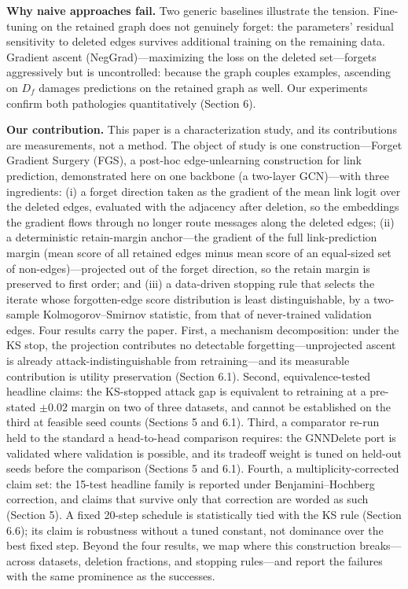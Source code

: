 \documentclass[pdflatex,sn-basic,Numbered]{sn-jnl}
\begin{document}
\textbf{Why naive approaches fail.} Two generic baselines illustrate the tension. Fine-tuning on the retained graph does not genuinely forget: the parameters' residual sensitivity to deleted edges survives additional training on the remaining data. Gradient ascent (NegGrad)---maximizing the loss on the deleted set---forgets aggressively but is uncontrolled: because the graph couples examples, ascending on $D_f$ damages predictions on the retained graph as well. Our experiments confirm both pathologies quantitatively (Section 6).

\textbf{Our contribution.} This paper is a characterization study, and its contributions are measurements, not a method. The object of study is one construction---Forget Gradient Surgery (FGS), a post-hoc edge-unlearning construction for link prediction, demonstrated here on one backbone (a two-layer GCN)---with three ingredients: (i) a forget direction taken as the gradient of the mean link logit over the deleted edges, evaluated with the adjacency after deletion, so the embeddings the gradient flows through no longer route messages along the deleted edges; (ii) a deterministic retain-margin anchor---the gradient of the full link-prediction margin (mean score of all retained edges minus mean score of an equal-sized set of non-edges)---projected out of the forget direction, so the retain margin is preserved to first order; and (iii) a data-driven stopping rule that selects the iterate whose forgotten-edge score distribution is least distinguishable, by a two-sample Kolmogorov--Smirnov statistic, from that of never-trained validation edges. Four results carry the paper. First, a mechanism decomposition: under the KS stop, the projection contributes no detectable forgetting---unprojected ascent is already attack-indistinguishable from retraining---and its measurable contribution is utility preservation (Section 6.1). Second, equivalence-tested headline claims: the KS-stopped attack gap is equivalent to retraining at a pre-stated $\pm$0.02 margin on two of three datasets, and cannot be established on the third at feasible seed counts (Sections 5 and 6.1). Third, a comparator re-run held to the standard a head-to-head comparison requires: the GNNDelete port is validated where validation is possible, and its tradeoff weight is tuned on held-out seeds before the comparison (Sections 5 and 6.1). Fourth, a multiplicity-corrected claim set: the 15-test headline family is reported under Benjamini--Hochberg correction, and claims that survive only that correction are worded as such (Section 5). A fixed 20-step schedule is statistically tied with the KS rule (Section 6.6); its claim is robustness without a tuned constant, not dominance over the best fixed step. Beyond the four results, we map where this construction breaks---across datasets, deletion fractions, and stopping rules---and report the failures with the same prominence as the successes.
\end{document}

